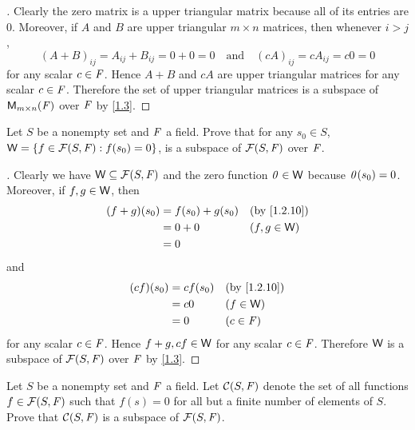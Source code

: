 \begin{proof}[]
	Clearly the zero matrix is a upper triangular matrix because all of its entries are \(0\).
	Moreover, if \(A\) and \(B\) are upper triangular \(m \times n\) matrices, then whenever \(i > j\),
	\[
		(A + B)_{i j} = A_{i j} + B_{i j} = 0 + 0 = 0 \quad \text{and} \quad (cA)_{i j} = cA_{i j} = c0 = 0
	\]
	for any scalar \(c \in \mathit{F}\).
	Hence \(A + B\) and \(cA\) are upper triangular matrices for any scalar \(c \in \mathit{F}\).
	Therefore the set of upper triangular matrices is a subspace of \(\MS\) over \(\mathit{F}\) by \cref{1.3}.
\end{proof}

\begin{ex}\label{ex:1.3.13}
	Let \(S\) be a nonempty set and \(\mathit{F}\) a field.
	Prove that for any \(s_0 \in S\), \(\mathsf{W} = \left\lbrace f \in \mathcal{F}(S, \mathit{F}) : f(s_0) = 0\right\rbrace\), is a subspace of \(\mathcal{F}(S, \mathit{F})\) over \(\mathit{F}\).
\end{ex}

\begin{proof}[]
	Clearly we have \(\mathsf{W} \subseteq \mathcal{F}(S, \mathit{F})\) and the zero function \(\mathit{0} \in \mathsf{W}\) because \(\mathit{0}(s_0) = 0\).
	Moreover, if \(f, g \in \mathsf{W}\), then
	\begin{align*}
		(f + g)(s_0) & = f(s_0) + g(s_0) &  & \by{1.2.10}   \\
		             & = 0 + 0           &  & (f, g \in \W) \\
		             & = 0
	\end{align*}
	and
	\begin{align*}
		(cf)(s_0) & = cf(s_0) &  & \by{1.2.10} \\
		          & = c0      &  & (f \in \W)  \\
		          & = 0       &  & (c \in \F)
	\end{align*}
	for any scalar \(c \in \mathit{F}\).
	Hence \(f + g, cf \in \mathsf{W}\) for any scalar \(c \in \mathit{F}\).
	Therefore \(\mathsf{W}\) is a subspace of \(\mathcal{F}(S, \mathit{F})\) over \(\mathit{F}\) by \cref{1.3}.
\end{proof}

\begin{ex}\label{ex:1.3.14}
	Let \(S\) be a nonempty set and \(\mathit{F}\) a field.
	Let \(\mathcal{C}(S, \mathit{F})\) denote the set of all functions \(f \in \mathcal{F}(S, \mathit{F})\) such that \(f(s) = 0\) for all but a finite number of elements of \(S\).
	Prove that \(\mathcal{C}(S, \mathit{F})\) is a subspace of \(\mathcal{F}(S, \mathit{F})\).
\end{ex}

